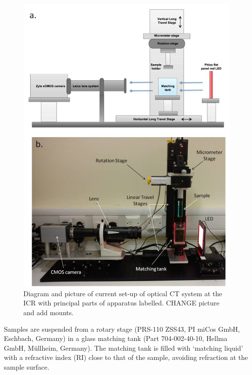	\begin{figure}
	\centering
	\includegraphics[width = \textwidth]{meth_img/Dosimetry_setup}
	\caption{Diagram and picture  of current set-up of optical CT system at the ICR with principal parts of apparatus labelled. CHANGE picture and add mounts.}
	\label{fig:setup_pic}
	\end{figure}

Samples are suspended from a rotary stage (PRS-110 ZSS43, PI miCos GmbH, Eschbach, Germany) in a glass matching tank (Part 704-002-40-10, Hellma GmbH, M\"{u}llheim, Germany). 
The matching tank is filled with `matching liquid' with a refractive index (RI) close to that of the sample, avoiding refraction at the sample surface. %

